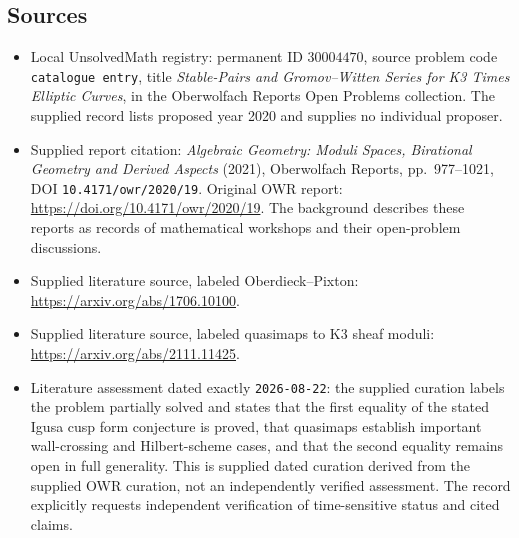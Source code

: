 \documentclass[11pt]{article}
\begin{document}
\subsection{Sources}
\begin{itemize}
\item Local UnsolvedMath registry: permanent ID \(30004470\), source problem code \texttt{catalogue entry}, title \emph{Stable-Pairs and Gromov--Witten Series for K3 Times Elliptic Curves}, in the Oberwolfach Reports Open Problems collection. The supplied record lists proposed year 2020 and supplies no individual proposer.
\item Supplied report citation: \emph{Algebraic Geometry: Moduli Spaces, Birational Geometry and Derived Aspects} (2021), Oberwolfach Reports, pp.\ 977--1021, DOI \texttt{10.4171/owr/2020/19}. Original OWR report: \url{https://doi.org/10.4171/owr/2020/19}. The background describes these reports as records of mathematical workshops and their open-problem discussions.
\item Supplied literature source, labeled Oberdieck--Pixton: \url{https://arxiv.org/abs/1706.10100}.
\item Supplied literature source, labeled quasimaps to K3 sheaf moduli: \url{https://arxiv.org/abs/2111.11425}.
\item Literature assessment dated exactly \texttt{2026-08-22}: the supplied curation labels the problem partially solved and states that the first equality of the stated Igusa cusp form conjecture is proved, that quasimaps establish important wall-crossing and Hilbert-scheme cases, and that the second equality remains open in full generality. This is supplied dated curation derived from the supplied OWR curation, not an independently verified assessment. The record explicitly requests independent verification of time-sensitive status and cited claims.
\end{itemize}
\end{document}
